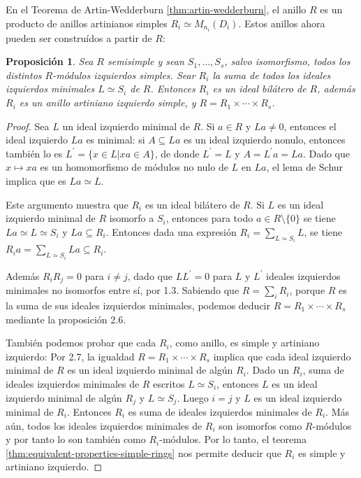 \documentclass{article}
\newtheorem{proposition}{Proposición}[section]
\begin{document}
En el Teorema de Artin-Wedderburn \ref{thm:artin-wedderburn}, el anillo $R$ es un producto de anillos artinianos simples $R_i \simeq M_{n_i}(D_i)$.
Estos anillos ahora pueden ser construídos a partir de $R$:

\begin{proposition}\label{prop:artin-wedderburn-simple-components-specification}
    Sea $R$ semisimple y sean $S_1, \dots, S_s$, salvo isomorfismo, todos los distintos $R$-módulos izquierdos simples.
    Sear $R_i$ la suma de todos los ideales izquierdos minimales $L \simeq S_i$ de $R$.
    Entonces $R_i$ es un ideal bilátero de $R$, además $R_i$ es un anillo artiniano izquierdo simple, y $R = R_1 \times \cdots \times R_s$.
\end{proposition}

\begin{proof}
    Sea $L$ un ideal izquierdo minimal de $R$. Si $a \in R$ y $La \neq 0$, entonces el ideal izquierdo $La$ es minimal: si $A \subseteq La$ es un ideal izquierdo nonulo, entonces también lo es $L^\prime = \{x \in L | x a \in A\}$, de donde $L^\prime = L$ y $A = L^\prime a = La$.
    Dado que $x \mapsto x a$ es un homomorfismo de módulos no nulo de $L$ en $La$, el lema de Schur implica que es $La \simeq L$.
    
    Este argumento muestra que $R_i$ es un ideal bilátero de $R$.
    Si $L$ es un ideal izquierdo minimal de $R$ isomorfo a $S_i$, entonces para todo $a \in R \setminus \{0\}$ se tiene $La \simeq L \simeq S_i$ y $La \subseteq R_i$.
    Entonces dada una expresión $R_i = \sum_{L \simeq S_i} L$, se tiene $R_i a = \sum_{L \simeq S_i} La \subseteq R_i$.

    Además $R_i R_j = 0$ para $i \neq j$, dado que $L L^\prime = 0$ para $L$ y $L^\prime$ ideales izquierdos minimales no isomorfos entre sí, por 1.3.
    Sabiendo que $R = \sum_i R_i$, porque $R$ es la suma de sus ideales izquierdos minimales, podemos deducir $R = R_1 \times \cdots \times R_s$ mediante la proposición 2.6.

    También podemos probar que cada $R_i$, como anillo, es simple y artiniano izquierdo:
    Por 2.7, la igualdad $R = R_1 \times \cdots \times R_s$ implica que cada ideal izquierdo minimal de $R$ es un ideal izquierdo minimal de algún $R_i$.
    Dado un $R_i$, suma de ideales izquierdos minimales de $R$ escritos $L \simeq S_i$, entonces $L$ es un ideal izquierdo minimal de algún $R_j$ y $L \simeq S_j$.
    Luego $i = j$ y $L$ es un ideal izquierdo minimal de $R_i$.
    Entonces $R_i$ es suma de ideales izquierdos minimales de $R_i$.
    Más aún, todos los ideales izquierdos minimales de $R_i$ son isomorfos como $R$-módulos y por tanto lo son también como $R_i$-módulos.
    Por lo tanto, el teorema \ref{thm:equivalent-properties-simple-rings} nos permite deducir que $R_i$ es simple y artiniano izquierdo.
\end{proof}
\end{document}
